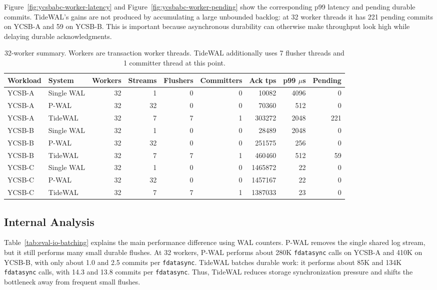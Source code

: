 Figure~\ref{fig:ycsbabc-worker-latency} and
Figure~\ref{fig:ycsbabc-worker-pending} show the corresponding p99 latency and
pending durable commits.  TideWAL's gains are not produced by accumulating a
large unbounded backlog: at 32 worker threads it has 221 pending commits on
YCSB-A and 59 on YCSB-B.  This is important because asynchronous durability can
otherwise make throughput look high while delaying durable acknowledgments.

\begin{table}[t]
  \centering
  \small
  \caption{32-worker summary.  Workers are transaction worker threads.  TideWAL
  additionally uses 7 flusher threads and 1 committer thread at this point.}
  \label{tab:eval-32worker-summary}
  \begin{tabular}{llrrrrrrr}
    \hline
    Workload & System & Workers & Streams & Flushers & Committers & Ack tps & p99 $\mu$s & Pending \\
    \hline
    YCSB-A & Single WAL & 32 & 1  & 0 & 0 & 10082  & 4096 & 0 \\
    YCSB-A & P-WAL      & 32 & 32 & 0 & 0 & 70360  & 512  & 0 \\
    YCSB-A & TideWAL    & 32 & 7  & 7 & 1 & 303272 & 2048 & 221 \\
    YCSB-B & Single WAL & 32 & 1  & 0 & 0 & 28489  & 2048 & 0 \\
    YCSB-B & P-WAL      & 32 & 32 & 0 & 0 & 251575 & 256  & 0 \\
    YCSB-B & TideWAL    & 32 & 7  & 7 & 1 & 460460 & 512  & 59 \\
    YCSB-C & Single WAL & 32 & 1  & 0 & 0 & 1465872 & 22 & 0 \\
    YCSB-C & P-WAL      & 32 & 32 & 0 & 0 & 1457167 & 22 & 0 \\
    YCSB-C & TideWAL    & 32 & 7  & 7 & 1 & 1387033 & 23 & 0 \\
    \hline
  \end{tabular}
\end{table}

\subsection{Internal Analysis}
\label{sec:evaluation-internal}

Table~\ref{tab:eval-io-batching} explains the main performance difference using
WAL counters.  P-WAL removes the single shared log stream, but it still performs
many small durable flushes.  At 32 workers, P-WAL performs about 280K
\texttt{fdatasync} calls on YCSB-A and 410K on YCSB-B, with only about 1.0 and
2.5 commits per \texttt{fdatasync}.  TideWAL batches durable work: it performs
about 85K and 134K \texttt{fdatasync} calls, with 14.3 and 13.8 commits per
\texttt{fdatasync}.  Thus, TideWAL reduces storage synchronization pressure and
shifts the bottleneck away from frequent small flushes.

